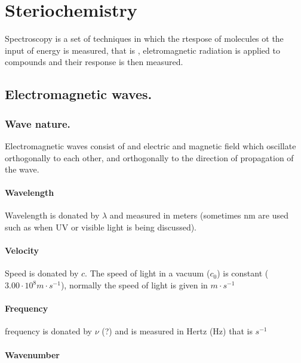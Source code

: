 \documentclass[]{article}
\let\oldparagraph\paragraph
\renewcommand{\paragraph}[1]{\oldparagraph{#1}\mbox{}}
\begin{document}
\section{Steriochemistry}\label{steriochemistry}

Spectroscopy is a set of techniques in which the rtespose of molecules
ot the input of energy is measured, that is , eletromagnetic radiation
is applied to compounds and their response is then measured.

\subsection{Electromagnetic waves.}\label{electromagnetic-waves.}

\subsubsection{Wave nature.}\label{wave-nature.}

Electromagnetic waves consist of and electric and magnetic field which
oscillate orthogonally to each other, and orthogonally to the direction
of propagation of the wave.

\paragraph{Wavelength}\label{wavelength}

Wavelength is donated by \(\lambda\) and measured in meters (sometimes
nm are used such as when UV or visible light is being discussed).

\paragraph{Velocity}\label{velocity}

Speed is donated by \(c\). The speed of light in a vacuum (\(c_0\)) is
constant (\(3.00 \cdot 10^{8}m\cdot s^{-1}\)), normally the speed of
light is given in \(m\cdot s^{-1}\)

\paragraph{Frequency}\label{frequency}

frequency is donated by \(\nu\) (?) and is measured in Hertz (Hz) that
is \(s^{-1}\)

\paragraph{Wavenumber}\label{wavenumber}
\end{document}
